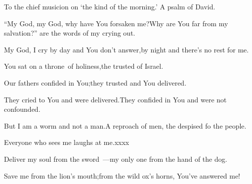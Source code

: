 
\begin{inparaenum}
  \noindent{} To the chief musicion on `the kind of the morning.' A psalm of David.\smallskip%
  
  \pc {} ``My God, my God, why have You forsaken me?\pa Why are You far from my salvation?'' are the words of my crying out.%
  
  \pc {} My God, I cry by day and You don't answer,\pa by night and there's no rest for me.%
  
  \pd {} You sat on a throne\understood\ of holiness,\pa the trusted of Israel.%
  
  \pc {} Our fathers confided in You;\pa they trusted and You delivered.%
  
  \pc {} They cried to You and were delivered.\pa They confided in You and were not confounded.%
  
  \pd {} But I am a worm and not a man.\pa A reproach of men, the despised fo the people.%
  
  \pc {} Everyone who sees me laughs at me.\pa xxxx%
  
  \pc {} %
  
  \pc {} %
  
  \pc {} %
  
  \pc {} %
  
  \pd {} %
  
  \pc {} %
  
  \pc {} %
  
  \pd %
  
  \pc {} %
  
  \pd %
  
  \pc {} %
  
  \pd %
  
  \pc {} %
  
  \pc {} %
  
  \pd {} %
  
  \pc {} Deliver my soul from the sword~---\pa my only one from the hand of the dog.%
  
  \pc {} Save me from the lion's mouth;\pa from the wild ox's horns, You've answered me!%
  

\end{inparaenum}
